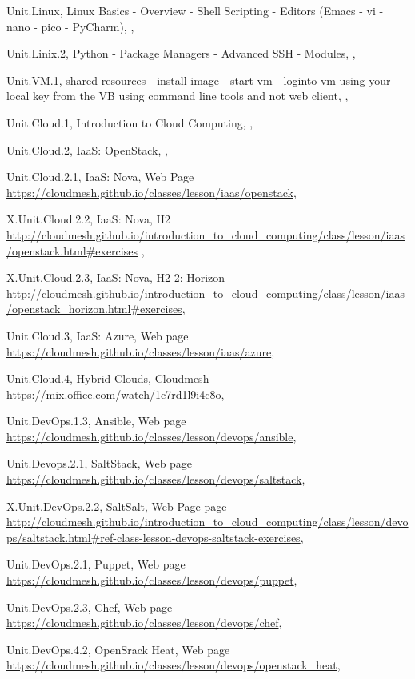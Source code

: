 Unit.Linux, Linux Basics - Overview - Shell Scripting -  Editors (Emacs - vi - nano - pico - PyCharm), ,

Unit.Linix.2, Python - Package Managers - Advanced SSH - Modules, ,

Unit.VM.1, shared resources - install image -  start vm -  loginto vm using your local key from the VB using command line tools and not web client, ,

Unit.Cloud.1, Introduction to Cloud Computing, , 

Unit.Cloud.2, IaaS: OpenStack, ,

Unit.Cloud.2.1, IaaS: Nova, Web Page \url{https://cloudmesh.github.io/classes/lesson/iaas/openstack},

X.Unit.Cloud.2.2, IaaS: Nova, H2 \url{http://cloudmesh.github.io/introduction_to_cloud_computing/class/lesson/iaas/openstack.html#exercises} ,

X.Unit.Cloud.2.3, IaaS: Nova, H2-2: Horizon \url{http://cloudmesh.github.io/introduction_to_cloud_computing/class/lesson/iaas/openstack_horizon.html#exercises},

Unit.Cloud.3, IaaS: Azure, Web page \url{https://cloudmesh.github.io/classes/lesson/iaas/azure},  

Unit.Cloud.4, Hybrid Clouds, Cloudmesh \url{https://mix.office.com/watch/1c7rd1l9i4c8o},

Unit.DevOps.1.3, Ansible, Web page \url{https://cloudmesh.github.io/classes/lesson/devops/ansible},

Unit.Devops.2.1, SaltStack, Web page \url{https://cloudmesh.github.io/classes/lesson/devops/saltstack}, 

X.Unit.DevOps.2.2, SaltSalt, Web Page page \url{http://cloudmesh.github.io/introduction_to_cloud_computing/class/lesson/devops/saltstack.html#ref-class-lesson-devops-saltstack-exercises}, 

Unit.DevOps.2.1, Puppet, Web page \url{https://cloudmesh.github.io/classes/lesson/devops/puppet}, 


Unit.DevOps.2.3, Chef, Web page \url{https://cloudmesh.github.io/classes/lesson/devops/chef}, 


Unit.DevOps.4.2, OpenSrack Heat, Web page \url{https://cloudmesh.github.io/classes/lesson/devops/openstack_heat}, 

